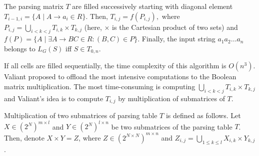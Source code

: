 The parsing matrix $T$ are filled successively starting with diagonal element $T_{i - 1, i} = \{ A \mid A \rightarrow a_{i} \in R\}.$
Then, $T_{i, j} = f(P_{i, j}),$ where
$P_{i, j} = \bigcup\limits_{i < k < j} T_{i,k} \times T_{k, j}$ (here, $\times$ is the Cartesian product of two sets) and
$f(P) = \{A \mid \exists A \rightarrow BC \in R : (B, C) \in P\}.$
Finally, the input string $a_{1}a_{2} \dots a_{n}$ belongs to $L_{G}(S)$ iff $S \in T_{0, n}$.

If all cells are filled sequentially, the time complexity of this algorithm is $O(n^3)$.
Valiant proposed to offload the most intensive computations to the Boolean matrix multiplication. 
The most time-consuming is computing $\bigcup\limits_{i < k < j} T_{i, k} \times T_{k, j}$ and Valiant's idea is to compute $T_{i, j}$ by multiplication of submatrices of $T$.

Multiplication of two submatrices of parsing table $T$ is defined as follows.
Let $X \in (2^N)^{m \times l}$ and $Y \in (2^N)^{l \times n}$ be two submatrices of the parsing table $T$. 
Then, denote $X \times Y = Z$, where $Z \in (2^{N \times N})^{m \times n}$ and $Z_{i, j} = \bigcup\limits_{ 1 \leq k \leq l} X_{i, k} \times Y_{k, j}$.

\vspace{-23pt}


